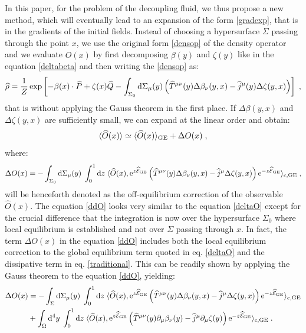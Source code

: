 \documentclass[prd,superscriptaddress,nofootinbib,notitlepage]{revtex4-1}
\def\wT{{\widehat T}}
\def\wj{{\widehat j}}
\def\wP{{\widehat P}}
\def\wQ{{\widehat Q}}
\def\wE{{\widehat{\cal E}}}
\def\wrho{{\widehat{\rho}}}
\def\wO{\widehat O}
\def\wQ{\widehat Q}
\newcommand{\e}{{\rm e}}
\newcommand{\di}{{\rm d}}
\begin{document}
In this paper, for the problem of the decoupling fluid, we thus propose a new method, which will eventually lead to an 
expansion of the form \eqref{gradexp}, that is in the gradients of the initial fields. Instead of choosing a hypersurface 
$\Sigma$ passing through the point $x$, we use the original form \eqref{densop} of the density operator and we evaluate 
$\wO(x)$ by first decomposing $\beta(y)$ and $\zeta(y)$ like in the equation \eqref{deltabeta} and then writing the \eqref{densop} 
as:
%
\begin{equation}\label{densop3}
    \wrho =\frac{1}{Z}\exp\left[-\beta(x) \cdot \wP + \zeta(x) \wQ - \int_{\Sigma_0}\di\Sigma_\mu(y)
    \left(\wT^{\mu\nu}(y) \Delta\beta_\nu(y,x)-\wj^\mu(y)\Delta\zeta(y,x)\right)\right]\;,
\end{equation}
%
that is without applying the Gauss theorem in the first place. If $\Delta\beta(y,x)$ and $\Delta\zeta(y,x)$ are sufficiently
small, we can expand at the linear order and obtain:
%
\begin{equation}\label{linresp}
    \langle\wO(x)\rangle \simeq \langle\wO(x)\rangle_{\rm GE}+ \Delta O(x)\;,
\end{equation}
%
where:
%
\begin{equation}\label{ddO}
    \Delta O(x) = -\int_{\Sigma_0}\di\Sigma_\mu(y) \; \int^1_0\di z \; \langle\wO(x),
    \e^{z\wE_{\rm GE}}\left(\wT^{\mu\nu}(y)\Delta\beta_\nu(y,x)-\wj^\mu\Delta\zeta(y,x)\right)\e^{-z\wE_{\rm GE}}
    \rangle_{c,\mathrm{GE}} \;,
\end{equation}
%
will be henceforth denoted as the off-equilibrium correction of the observable $\wO(x)$. The equation \eqref{ddO}
looks very similar to the equation \eqref{deltaO} except for the crucial difference that the integration is now
over the hypersurface $\Sigma_0$ where local equilibrium is established and not over $\Sigma$ passing
through $x$. In fact, the term $\Delta O(x)$ in the equation \eqref{ddO} includes both the 
local equilibrium correction to the global equilibrium term quoted in eq. \eqref{deltaO} and the dissipative term
in eq. \eqref{traditional}. This can be readily shown by applying the Gauss theorem to the equation \eqref{ddO},
yielding:
%
\begin{equation}\label{gauss2}
    \begin{split}
         \Delta O(x) & =-\int_{\Sigma}\di\Sigma_\mu(y) \; \int^1_0\di z \; \langle\wO(x),
    \e^{z\wE_{\rm GE}}\left(\wT^{\mu\nu}(y)\Delta\beta_\nu(y,x)-\wj^\mu\Delta\zeta(y,x)\right)\e^{-z\wE_{\rm GE}}
    \rangle_{c,\mathrm{GE}}  \\
    & + \int_{\Omega}\di^4 y \; \int^1_0\di z \; \langle\wO(x),
    \e^{z\wE_{\rm GE}}\left(\wT^{\mu\nu}(y)\partial_\mu \beta_\nu(y)
    -\wj^\mu \partial_\mu \zeta(y)\right)\e^{-z\wE_{\rm GE}} \rangle_{c,\mathrm{GE}}\;.
    \end{split}
\end{equation}
\end{document}
